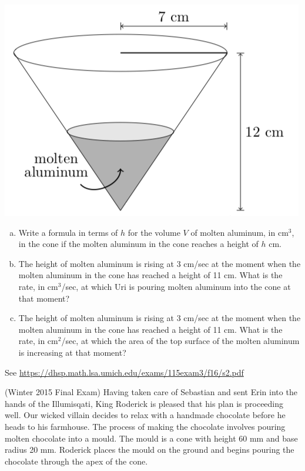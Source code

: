 \documentclass[11pt]{exam}
\begin{document}
\begin{questions}
\begin{center}
  \includegraphics[scale=0.4]{Figures/aluminium.png}
\end{center}
\begin{enumerate}[(a)]
\item Write a formula in terms of $h$ for the volume $V$ of molten aluminum, in cm$^3$, in the cone if the molten aluminum in the cone reaches a height of $h$ cm.
\item The height of molten aluminum is rising at 3 cm/sec at the moment when the molten aluminum in the cone has reached a height of 11 cm. What is the rate, in cm$^3$/sec, at which Uri is pouring molten aluminum into the cone at that moment?
\item The height of molten aluminum is rising at 3 cm/sec at the moment when the molten aluminum in the cone has reached a height of 11 cm. What is the rate, in cm$^2$/sec, at which the area of the top surface of the molten aluminum is increasing at that moment?
\end{enumerate}
\begin{solution}
  See \href{https://dhsp.math.lsa.umich.edu/exams/115exam3/f16/s2.pdf}{https://dhsp.math.lsa.umich.edu/exams/115exam3/f16/s2.pdf}
\end{solution}
\pagebreak
\question (Winter 2015 Final Exam) %
Having taken care of Sebastian and sent Erin into the hands of the Illumisqati, King Roderick is pleased that his plan is proceeding well. Our wicked villain decides to relax with a handmade chocolate before he heads to his farmhouse. The process of making the chocolate involves pouring molten chocolate into a mould. The mould is a cone with height 60 mm and base radius 20 mm. Roderick places the mould on the ground and begins pouring the chocolate through the apex of the cone.

\end{questions}
\end{document}
